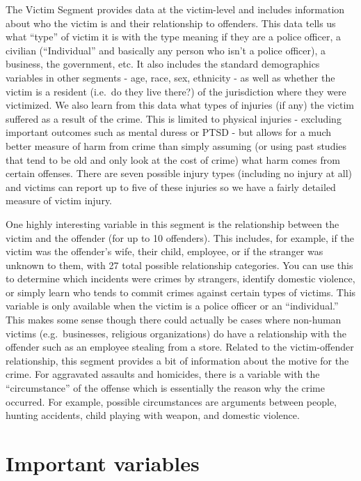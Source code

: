 \documentclass[
  12pt,
  openany]{book}
\begin{document}
The Victim Segment provides data at the victim-level and includes information about who the victim is and their relationship to offenders. This data tells us what ``type'' of victim it is with the type meaning if they are a police officer, a civilian (``Individual'' and basically any person who isn't a police officer), a business, the government, etc. It also includes the standard demographics variables in other segments - age, race, sex, ethnicity - as well as whether the victim is a resident (i.e.~do they live there?) of the jurisdiction where they were victimized. We also learn from this data what types of injuries (if any) the victim suffered as a result of the crime. This is limited to physical injuries - excluding important outcomes such as mental duress or PTSD - but allows for a much better measure of harm from crime than simply assuming (or using past studies that tend to be old and only look at the cost of crime) what harm comes from certain offenses. There are seven possible injury types (including no injury at all) and victims can report up to five of these injuries so we have a fairly detailed measure of victim injury.

One highly interesting variable in this segment is the relationship between the victim and the offender (for up to 10 offenders). This includes, for example, if the victim was the offender's wife, their child, employee, or if the stranger was unknown to them, with 27 total possible relationship categories. You can use this to determine which incidents were crimes by strangers, identify domestic violence, or simply learn who tends to commit crimes against certain types of victims. This variable is only available when the victim is a police officer or an ``individual.'' This makes some sense though there could actually be cases where non-human victims (e.g.~businesses, religious organizations) do have a relationship with the offender such as an employee stealing from a store. Related to the victim-offender relationship, this segment provides a bit of information about the motive for the crime. For aggravated assaults and homicides, there is a variable with the ``circumstance'' of the offense which is essentially the reason why the crime occurred. For example, possible circumstances are arguments between people, hunting accidents, child playing with weapon, and domestic violence.

\hypertarget{important-variables-3}{%
\section{Important variables}\label{important-variables-3}}
\end{document}
